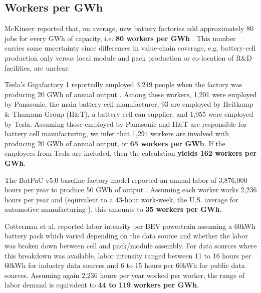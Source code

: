 \documentclass[sn-mathphys,Numbered]{sn-jnl}%
\begin{document}
\begin{appendices}
\clearpage
\section{Workers per GWh}

McKinsey reported that, on average, new battery factories add approximately 80 jobs for every GWh of capacity, i.e. \textbf{80 workers per GWh} \cite{Campagnol2022-yv}. This number carries some uncertainty since differences in value-chain coverage, e.g. battery-cell production only versus local module and pack production or co-location of R\&D facilities, are unclear. 

Tesla's Gigafactory 1 reportedly employed 3,249 people when the factory was producing 20 GWh of annual output \cite{Lambert2018-qy}. Among these workers, 1,201 were employed by Panasonic, the main battery cell manufacturer, 93 are employed by Heitkamp \& Thumann Group (H\&T), a battery cell can supplier, and 1,955 were employed by Tesla. Assuming those employed by Panasonic and H\&T are responsible for battery cell manufacturing, we infer that 1,294 workers are involved with producing 20 GWh of annual output, or \textbf{65 workers per GWh}. If the employees from Tesla are included, then the calculation \textbf{yields 162 workers per GWh}.

The BatPaC v5.0 baseline factory model reported an annual labor of 3,876,000 hours per year to produce 50 GWh of output \cite{Knehr2022-sy}. Assuming each worker works 2,236 hours per year and (equivalent to a 43-hour work-week, the U.S. average for automotive manufacturing \cite{US_Bureau_of_Labor_Statistics2022-zg}), this amounts to \textbf{35 workers per GWh}.


Cotterman et al. \cite{Cotterman2022-jt} reported labor intensity per BEV powertrain assuming a 60kWh battery pack which varied depending on the data source and whether the labor was broken down between cell and pack/module assembly. For data sources where this breakdown was available, labor intensity ranged between 11 to 16 hours per 60kWh for industry data sources and 6 to 15 hours per 60kWh for public data sources. Assuming again 2,236 hours per year worked per worker, the range of labor demand is equivalent to \textbf{44 to 119 workers per GWh}.

\end{appendices}
\end{document}
